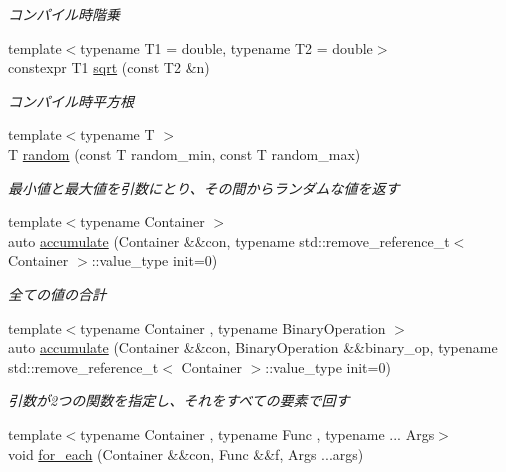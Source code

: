 \begin{DoxyCompactItemize}
\begin{DoxyCompactList}\small\item\em コンパイル時階乗 \end{DoxyCompactList}\item 
{\footnotesize template$<$typename T1  = double, typename T2  = double$>$ }\\constexpr T1 \mbox{\hyperlink{namespacesaki_a1059e80b300067041c754c1686b04dbd}{sqrt}} (const T2 \&n)
\begin{DoxyCompactList}\small\item\em コンパイル時平方根 \end{DoxyCompactList}\item 
{\footnotesize template$<$typename T $>$ }\\T \mbox{\hyperlink{namespacesaki_a636caf16f2f00cb734cc867646ac233f}{random}} (const T random\+\_\+min, const T random\+\_\+max)
\begin{DoxyCompactList}\small\item\em 最小値と最大値を引数にとり、その間からランダムな値を返す \end{DoxyCompactList}\item 
{\footnotesize template$<$typename Container $>$ }\\auto \mbox{\hyperlink{namespacesaki_a981cc67b0d421b1836678c3ac4069afd}{accumulate}} (Container \&\&con, typename std\+::remove\+\_\+reference\+\_\+t$<$ Container $>$\+::value\+\_\+type init=0)
\begin{DoxyCompactList}\small\item\em 全ての値の合計 \end{DoxyCompactList}\item 
{\footnotesize template$<$typename Container , typename Binary\+Operation $>$ }\\auto \mbox{\hyperlink{namespacesaki_acb8c3f650d3b5d3b06259b91bd7ad85d}{accumulate}} (Container \&\&con, Binary\+Operation \&\&binary\+\_\+op, typename std\+::remove\+\_\+reference\+\_\+t$<$ Container $>$\+::value\+\_\+type init=0)
\begin{DoxyCompactList}\small\item\em 引数が2つの関数を指定し、それをすべての要素で回す \end{DoxyCompactList}\item 
{\footnotesize template$<$typename Container , typename Func , typename ... Args$>$ }\\void \mbox{\hyperlink{namespacesaki_a7d20a397ebb381703cc0f794615d939e}{for\+\_\+each}} (Container \&\&con, Func \&\&f, Args ...args)

\end{DoxyCompactItemize}

